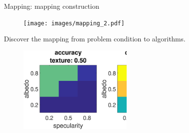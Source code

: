\documentclass[10pt]{beamer}
\begin{document}
\begin{frame}{Mapping: mapping construction}

\begin{figure}
\centering
\texttt{[image: images/mapping\_2.pdf]}
\end{figure}

Discover the mapping from problem condition to algorithms.
\begin{figure}
\centering
\includegraphics[width=0.5\textwidth]{mapping/lookup_table/mvs_texture_05}
\end{figure}

\end{frame}

\end{document}
